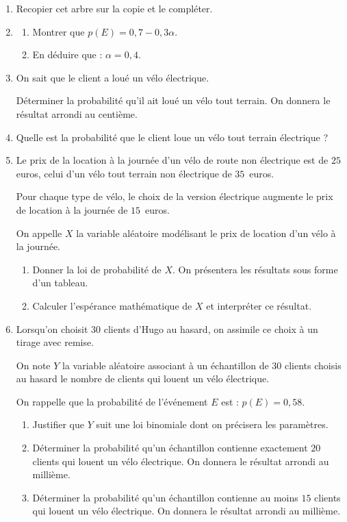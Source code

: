 \documentclass[10pt]{article}
\begin{document}
\medskip

\begin{enumerate}
\item Recopier cet arbre sur la copie et le compléter.
\item 
	\begin{enumerate}
		\item Montrer que $p(E) = 0,7 - 0,3\alpha$.
		\item En déduire que : $\alpha = 0,4$.
	\end{enumerate}
\item On sait que le client a loué un vélo électrique.

Déterminer la probabilité qu'il ait loué un vélo tout terrain. On donnera le résultat arrondi au centième.
\item Quelle est la probabilité que le client loue un vélo tout terrain électrique ?
\item Le prix de la location à la journée d'un vélo de route non électrique est de $25$ euros, celui d'un vélo tout terrain non électrique de $35$~euros.

Pour chaque type de vélo, le choix de la version électrique augmente le prix de location à la journée de $15$~euros. 

On appelle $X$ la variable aléatoire modélisant le prix de location d'un vélo à la journée.
	\begin{enumerate}
		\item Donner la loi de probabilité de $X$. On présentera les résultats sous forme d'un tableau.
		\item Calculer l'espérance mathématique de $X$ et interpréter ce résultat.
	\end{enumerate}	
\item Lorsqu'on choisit $30$ clients d'Hugo au hasard, on assimile ce choix à un tirage avec remise.

On note $Y$ la variable aléatoire associant à un échantillon de 30 clients choisis au hasard le nombre de clients qui louent un vélo électrique.

On rappelle que la probabilité de l'événement $E$ est : $p(E) = 0,58$.
	\begin{enumerate}
		\item Justifier que $Y$ suit une loi binomiale dont on précisera les paramètres.
		\item Déterminer la probabilité qu'un échantillon contienne exactement $20$ clients qui louent un vélo électrique. On donnera le résultat arrondi au millième.
		\item Déterminer la probabilité qu'un échantillon contienne au moins $15$ clients qui louent un vélo électrique. On donnera le résultat arrondi au millième.
	\end{enumerate}
\end{enumerate}

\bigskip
\end{document}

